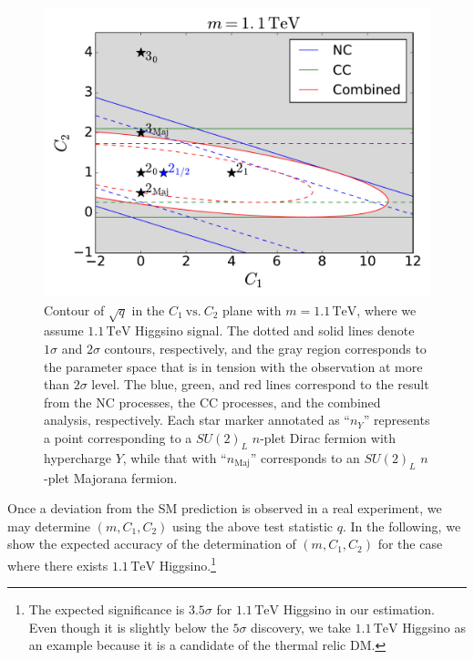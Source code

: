 \documentclass[12pt,twoside,book]{article}
\begin{document}
\begin{figure}[t]
  \centering
  \includegraphics[width=0.5\linewidth]{C1_vs_C2_Higgsino.pdf}
  \caption{
    Contour of $\sqrt{q}$ in the $C_1~\mathrm{vs.}~C_2$ plane with $m = 1.1\,\mathrm{TeV}$, where we assume $1.1\,\mathrm{TeV}$ Higgsino signal.
    The dotted and solid lines denote $1\sigma$ and $2\sigma$ contours, respectively, and the gray region corresponds to the parameter space that is in tension with the observation at more than $2\sigma$ level.
    The blue, green, and red lines correspond to the result from the NC processes, the CC processes, and the combined analysis, respectively.
    Each star marker annotated as ``$n_Y$'' represents a point corresponding to a $SU(2)_L$ $n$-plet Dirac fermion with hypercharge $Y$, while that with ``$n_\mathrm{Maj}$'' corresponds to an $SU(2)_L$ $n$-plet Majorana fermion.
  }
  \label{fig_c1_c2}
\end{figure}

Once a deviation from the SM prediction is observed in a real experiment, we may determine $(m, C_1, C_2)$ using the above test statistic $q$.
In the following, we show the expected accuracy of the determination of $(m, C_1, C_2)$ for the case where there exists $1.1\,\mathrm{TeV}$ Higgsino.\footnote
{
  The expected significance is $3.5\sigma$ for $1.1\,\mathrm{TeV}$ Higgsino in our estimation.
  Even though it is slightly below the $5\sigma$ discovery, we take $1.1\,\mathrm{TeV}$ Higgsino as an example because it is a candidate of the thermal relic DM.
}
\end{document}
